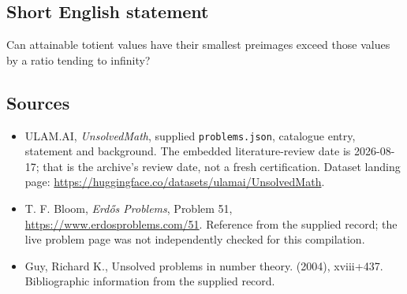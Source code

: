 \documentclass[11pt,a4paper]{article}
\begin{document}
\subsection{Short English statement}

Can attainable totient values have their smallest preimages exceed those values by a ratio tending to infinity?

\subsection{Sources}

{\small

\begin{itemize}

\item[\hypertarget{source:statement:1}{S1}] ULAM.AI, \emph{UnsolvedMath}, supplied \texttt{problems.json}, catalogue entry, statement and background. The embedded literature-review date is 2026-08-17; that is the archive’s review date, not a fresh certification. Dataset landing page: \url{https://huggingface.co/datasets/ulamai/UnsolvedMath}.

\item[\hypertarget{source:statement:2}{S2}] T. F. Bloom, \emph{Erdős Problems}, Problem 51, \url{https://www.erdosproblems.com/51}. Reference from the supplied record; the live problem page was not independently checked for this compilation.

\item[\hypertarget{source:statement:3}{S3}] Guy, Richard K., Unsolved problems in number theory. (2004), xviii+437. Bibliographic information from the supplied record.

\end{itemize}

}

\label{end:statement}
\end{document}
